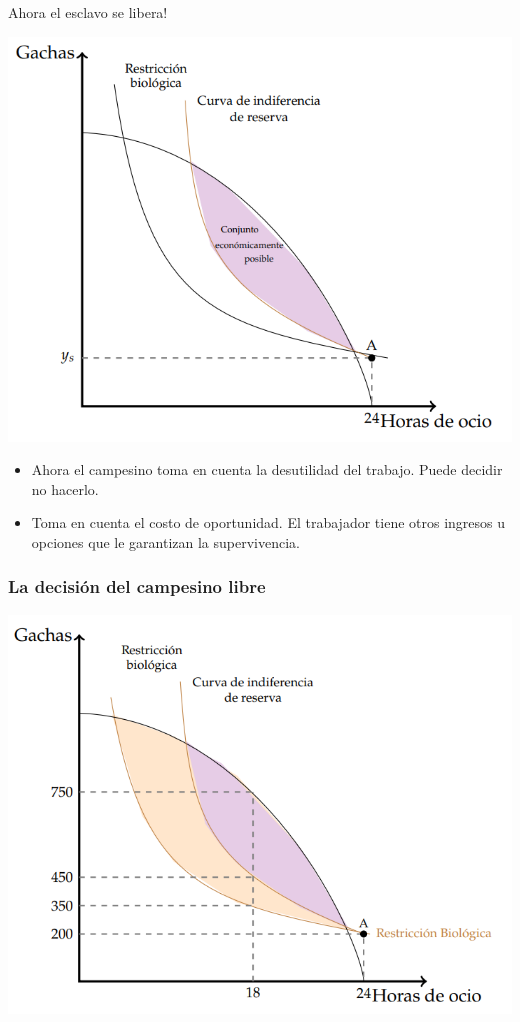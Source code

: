 \documentclass{beamer}
\begin{document}
\begin{frame}{Ahora el esclavo se libera!}
    \begin{center}
        \includegraphics[scale=0.5]{../Figures/C19.9.png}   
    \end{center}
    \begin{itemize}
        \item Ahora el campesino toma en cuenta la desutilidad del trabajo. Puede decidir no hacerlo.
        \item Toma en cuenta el costo de oportunidad. El trabajador tiene otros ingresos u opciones que le garantizan la supervivencia.
    \end{itemize}
\end{frame}


\begin{frame}
\frametitle{La decisión del campesino libre}
\begin{center}
    \includegraphics[scale=0.6]{../Figures/C19.10.png}   
\end{center}
\end{frame}
\end{document}
